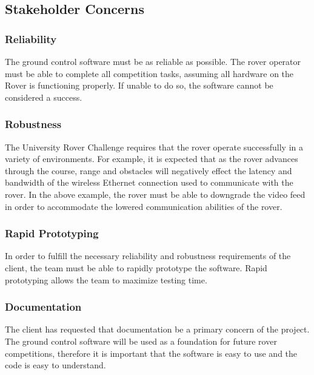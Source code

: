 \subsection{Stakeholder Concerns}
\subsubsection{Reliability}
The ground control software must be as reliable as possible.
The rover operator must be able to complete all competition tasks, assuming all hardware on the Rover is functioning properly.
If unable to do so, the software cannot be considered a success.
\subsubsection{Robustness}
The University Rover Challenge requires that the rover operate successfully in a variety of environments.
For example, it is expected that as the rover advances through the course, range and obstacles will negatively effect the latency and bandwidth of the wireless Ethernet connection used to communicate with the rover.
In the above example, the rover must be able to downgrade the video feed in order to accommodate the lowered communication abilities of the rover.
\subsubsection{Rapid Prototyping}
In order to fulfill the necessary reliability and robustness requirements of the client, the team must be able to rapidly prototype the software.
Rapid prototyping allows the team to maximize testing time.
\subsubsection{Documentation}
The client has requested that documentation be a primary concern of the project.
The ground control software will be used as a foundation for future rover competitions, therefore it is important that the software is easy to use and the code is easy to understand.